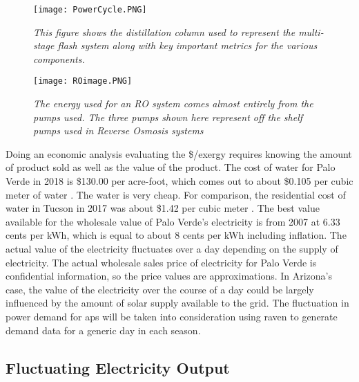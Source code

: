 \begin{figure*}[h!]
\centering

\texttt{[image: PowerCycle.PNG]}
\caption{\small \sl This figure shows the distillation column used to represent the multi-stage flash system along with key important metrics for the various components.}
\label{MSF}
\centering
\end{figure*}

\begin{figure*}[h!]
\centering
\texttt{[image: ROimage.PNG]}
\caption{\small \sl The energy used for an RO system comes almost entirely from the pumps used.  The three pumps shown here represent off the shelf pumps used in Reverse Osmosis systems}
\label{RO}
\centering
\end{figure*}

Doing an economic analysis evaluating the \$/exergy requires knowing the amount of product sold as well as the value of the product. The cost of water for Palo Verde in 2018 is \$130.00 per acre-foot, which comes out to about \$0.105 per cubic meter of water \cite{Brown2018}. The water is very cheap.  For comparison, the residential cost of water in Tucson in 2017 was about \$1.42 per cubic meter \cite{CityofTucson2017}. The best value available for the wholesale value of Palo Verde's electricity is from 2007 at 6.33 cents per kWh, which is equal to about 8 cents per kWh including inflation. The actual value of the electricity fluctuates over a day depending on the supply of electricity. The actual wholesale sales price of electricity for Palo Verde is confidential information, so the price values are approximations.  In Arizona's case, the value of the electricity over the course of a day could be largely influenced by the amount of solar supply available to the grid. The fluctuation in power demand for \ac{aps} will be taken into consideration using \ac{raven} to generate demand data for a generic day in each season.

\subsection{Fluctuating Electricity Output}

